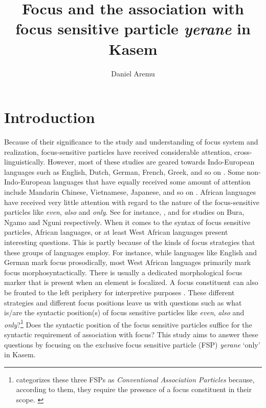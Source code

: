 \documentclass[output=paper,colorlinks,citecolor=brown,draftmode
]{langscibook}
\author{Daniel Aremu\affiliation{Goethe-Universität Frankfurt}}
\title{Focus and the association with focus sensitive particle \textit{yerane} in Kasem}
\begin{document}
\maketitle


\section{Introduction}

Because of their significance to the study and understanding of focus system and realization, focus-sensitive particles have received considerable attention, cross-linguistically. However, most of these studies are geared towards Indo-European languages such as English, Dutch, German, French, Greek, and so on \citep[cf.][]{rooth1985association, rooth1992theory, bayer1996directionality, bayer1999bound, kayne1998overt, barbiers2010focus, barbiers2014syntactic, iatridou2016our, quek2017severing}. Some non-Indo-European languages that have equally received some amount of attention include Mandarin Chinese, Vietnamese, Japanese, and so on \citep[cf.][]{lee2004syntax, hole2017crosslinguistic, erlewine2014a, erlewine2014b, erlewine2018focus, sun2021bipartite}. African languages have received very little attention with regard to the nature of the focus-sensitive particles like \textit{even}, \textit{also} and \textit{only}. See for instance, \citet{HartmannZimmermann2008}, \citet{Grubic2015} and \citet{carstens2020only} for studies on Bura, Ngamo and Nguni respectively. When it comes to the syntax of focus sensitive particles, African languages, or at least West African languages present interesting questions. This is partly because of the kinds of focus strategies that these groups of languages employ. For instance, while languages like English and German mark focus prosodically, most West African languages primarily mark focus morphosyntactically. There is usually a dedicated morphological focus marker that is present when an element is focalized. A focus constituent can also be fronted to the left periphery for interpretive purposes \citep{kiss1998identificational, cruschina2009syntactic, cruschina2012discourse, bianchi2016focus}. These different strategies and different focus positions leave us with questions such as what is/are the syntactic position(s) of focus sensitive particles like \textit{even}, \textit{also} and \textit{only}?\footnote{\citet{beaver2008sense} categorizes these three FSPs as \textit{Conventional Association Particles} because, according to them, they require the presence of a focus constituent in their scope. \citep[cf.][a.o.]{erlewine2014b}} Does the syntactic position of the focus sensitive particles suffice for the syntactic requirement of association with focus? This study aims to answer these questions by focusing on the exclusive focus sensitive particle (FSP) \textit{yerane} `only' in Kasem.
\end{document}
